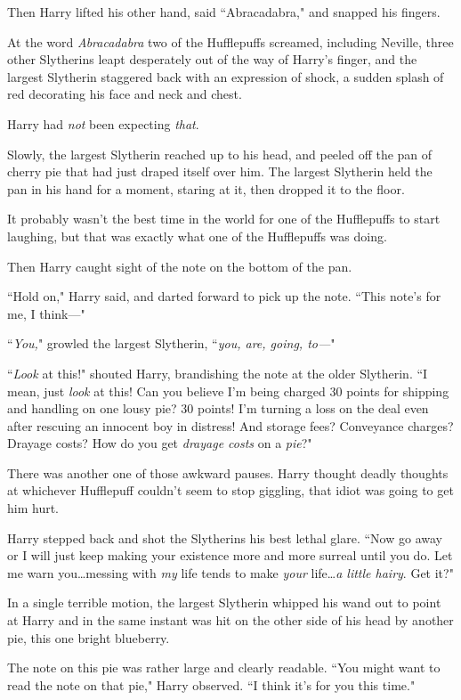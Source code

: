 Then Harry lifted his other hand, said ``Abracadabra," and snapped his fingers.

At the word \emph{Abracadabra} two of the Hufflepuffs screamed, including Neville, three other Slytherins leapt desperately out of the way of Harry's finger, and the largest Slytherin staggered back with an expression of shock, a sudden splash of red decorating his face and neck and chest.

Harry had \emph{not} been expecting \emph{that}.

Slowly, the largest Slytherin reached up to his head, and peeled off the pan of cherry pie that had just draped itself over him. The largest Slytherin held the pan in his hand for a moment, staring at it, then dropped it to the floor.

It probably wasn't the best time in the world for one of the Hufflepuffs to start laughing, but that was exactly what one of the Hufflepuffs was doing.

Then Harry caught sight of the note on the bottom of the pan.

``Hold on," Harry said, and darted forward to pick up the note. ``This note's for me, I think—"

``\emph{You,}" growled the largest Slytherin, ``\emph{you, are, going, to—}"

``\emph{Look} at this!" shouted Harry, brandishing the note at the older Slytherin. ``I mean, just \emph{look} at this! Can you believe I'm being charged 30 points for shipping and handling on one lousy pie? 30 points! I'm turning a loss on the deal even after rescuing an innocent boy in distress! And storage fees? Conveyance charges? Drayage costs? How do you get \emph{drayage costs} on a \emph{pie}?"

There was another one of those awkward pauses. Harry thought deadly thoughts at whichever Hufflepuff couldn't seem to stop giggling, that idiot was going to get him hurt.

Harry stepped back and shot the Slytherins his best lethal glare. ``Now go away or I will just keep making your existence more and more surreal until you do. Let me warn you…messing with \emph{my} life tends to make \emph{your} life…\emph{a little hairy}. Get it?"

In a single terrible motion, the largest Slytherin whipped his wand out to point at Harry and in the same instant was hit on the other side of his head by another pie, this one bright blueberry.

The note on this pie was rather large and clearly readable. ``You might want to read the note on that pie," Harry observed. ``I think it's for you this time."

